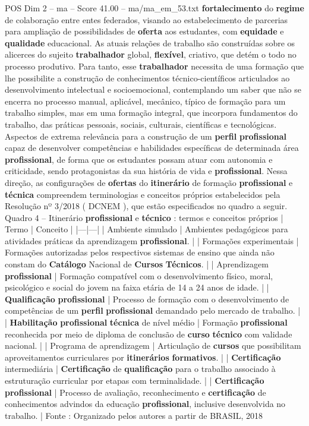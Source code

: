 \begin{textsample}{POS Dim 2 – ma – Score 41.00 – ma/ma\_em\_53.txt}
\textbf{fortalecimento} do \textbf{regime} de colaboração entre entes federados, visando ao estabelecimento de parcerias para ampliação de possibilidades de \textbf{oferta} aos estudantes, com \textbf{equidade} e \textbf{qualidade} educacional.
As atuais relações de trabalho são construídas sobre os alicerces do sujeito \textbf{trabalhador} global, \textbf{flexível}, criativo, que detém o todo no processo produtivo.
Para tanto, esse \textbf{trabalhador} necessita de uma formação que lhe possibilite a construção de conhecimentos técnico-científicos articulados ao desenvolvimento intelectual e socioemocional, contemplando um saber que não se encerra no processo manual, aplicável, mecânico, típico de formação para um trabalho simples, mas em uma formação integral, que incorpora fundamentos do trabalho, das práticas pessoais, sociais, culturais, científicas e tecnológicas.
Aspectos de extrema relevância para a construção de um \textbf{perfil} \textbf{profissional} capaz de desenvolver competências e habilidades específicas de determinada área \textbf{profissional}, de forma que os estudantes possam atuar com autonomia e criticidade, sendo protagonistas da sua história de vida e \textbf{profissional}.
Nessa direção, as configurações de \textbf{ofertas} do \textbf{itinerário} de formação \textbf{profissional} e \textbf{técnica} compreendem terminologias e conceitos próprios estabelecidos pela Resolução nº 3/2018 ( DCNEM ), que estão especificados no quadro a seguir.
Quadro 4 – Itinerário \textbf{profissional} e \textbf{técnico} : termos e conceitos próprios | Termo | Conceito | |---|---| | Ambiente simulado | Ambientes pedagógicos para atividades práticas da aprendizagem \textbf{profissional}. | | Formações experimentais | Formações autorizadas pelos respectivos sistemas de ensino que ainda não constam do \textbf{Catálogo} Nacional de \textbf{Cursos} \textbf{Técnicos}. | | Aprendizagem \textbf{profissional} | Formação compatível com o desenvolvimento físico, moral, psicológico e social do jovem na faixa etária de 14 a 24 anos de idade. | | \textbf{Qualificação} \textbf{profissional} | Processo de formação com o desenvolvimento de competências de um \textbf{perfil} \textbf{profissional} demandado pelo mercado de trabalho. | | \textbf{Habilitação} \textbf{profissional} \textbf{técnica} de nível médio | Formação \textbf{profissional} reconhecida por meio de diploma de conclusão de \textbf{curso} \textbf{técnico} com validade nacional. | | Programa de aprendizagem | Articulação de \textbf{cursos} que possibilitam aproveitamentos curriculares por \textbf{itinerários} \textbf{formativos}. | | \textbf{Certificação} intermediária | \textbf{Certificação} de \textbf{qualificação} para o trabalho associado à estruturação curricular por etapas com terminalidade. | | \textbf{Certificação} \textbf{profissional} | Processo de avaliação, reconhecimento e \textbf{certificação} de conhecimentos advindos da educação \textbf{profissional}, inclusive desenvolvida no trabalho. | Fonte : Organizado pelos autores a partir de BRASIL, 2018


\end{textsample}
